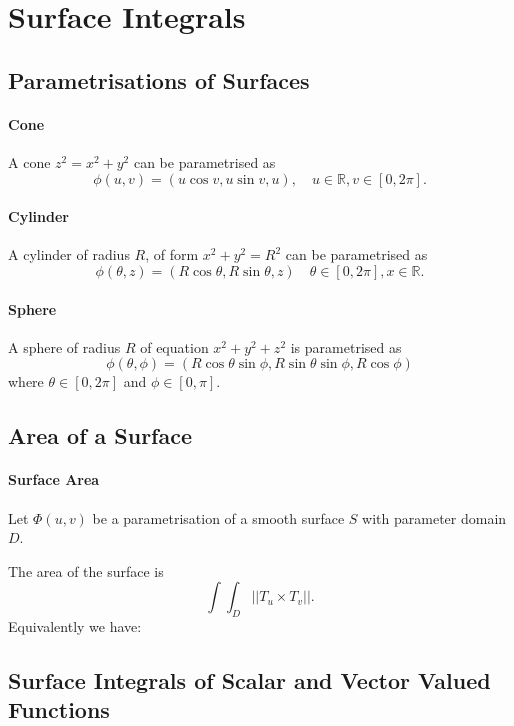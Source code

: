 
\section{Surface Integrals}

\subsection{Parametrisations of Surfaces}

\paragraph{Cone} A cone \(z^2 = x^2 + y^2\) can be parametrised as
\[
    \phi(u, v) = (u \cos v , u\sin v, u), \quad u\in \mathbb{R}, v\in [0, 2\pi].
\]
 
\paragraph{Cylinder}
A cylinder of radius \(R\), of form \(x^2 + y^2 = R^2\) can be parametrised as
\[
    \phi(\theta, z) = (R\cos \theta, R\sin \theta, z)
    \quad
    \theta\in [0, 2\pi], x\in \mathbb{R}.
\]

\paragraph{Sphere}
A sphere of radius \(R\) of equation \(x^2 + y^2 + z^2\)
is parametrised as
\[
    \phi(\theta, \phi) = (R\cos\theta \sin\phi, R\sin\theta \sin\phi, R\cos\phi)
\]
where \(\theta\in[0, 2\pi]\) and \(\phi \in [0, \pi]\).

\subsection{Area of a Surface}

\paragraph{Surface Area}
Let \(\Phi(u, v)\) be a parametrisation of a smooth surface \(S\) with
parameter domain \(D\).

The area of the surface is
\[\int\int_D \left|\left| T_u \times T_v \right|\right| .\]
Equivalently we have:


\subsection{Surface Integrals of Scalar and Vector Valued Functions}